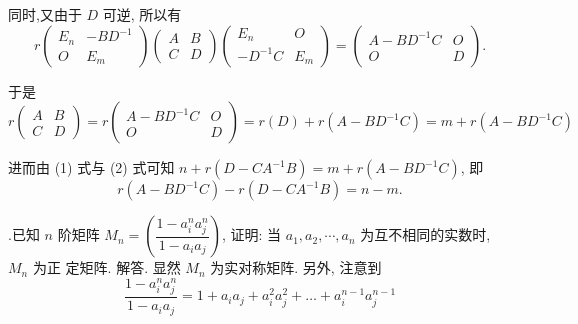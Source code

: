 \documentclass{article}
\begin{document}
同时,又由于 $D$ 可逆, 所以有
$$
    r\left(\begin{array}{cc}
            E_{n} & -B D^{-1} \\
            O     & E_{m}
        \end{array}\right)\left(\begin{array}{cc}
            A & B \\
            C & D
        \end{array}\right)\left(\begin{array}{cc}
            E_{n}     & O     \\
            -D^{-1} C & E_{m}
        \end{array}\right)=\left(\begin{array}{cc}
            A-B D^{-1} C & O \\
            O            & D
        \end{array}\right) .
$$

于是
\begin{equation}
    r\left(\begin{array}{cc}
            A & B \\
            C & D
        \end{array}\right)=r\left(\begin{array}{cc}
            A-B D^{-1} C & O \\
            O            & D
        \end{array}\right)=r(D)+r\left(A-B D^{-1} C\right)=m+r\left(A-B D^{-1} C\right)
    \tag{2}
\end{equation}

进而由 (1) 式与 (2) 式可知 $n+r\left(D-C A^{-1} B\right)=m+r\left(A-B D^{-1} C\right)$, 即
$$
    r\left(A-B D^{-1} C\right)-r\left(D-C A^{-1} B\right)=n-m .
$$

\vspace{1ex}
{.}已知 $n$ 阶矩阵 $M_{n}=\left(\dfrac{1-a_{i}^{n} a_{j}^{n}}{1-a_{i} a_{j}}\right)$, 证明: 当 $a_{1}, a_{2}, \cdots, a_{n}$ 为互不相同的实数时, $M_{n}$ 为正 定矩阵.
解答. 显然 $M_{n}$ 为实对称矩阵. 另外, 注意到
$$
    \dfrac{1-a_{i}^{n} a_{j}^{n}}{1-a_{i} a_{j}}=1+a_{i} a_{j}+a_{i}^{2} a_{j}^{2}+\ldots+a_{i}^{n-1} a_{j}^{n-1}
$$
\end{document}
